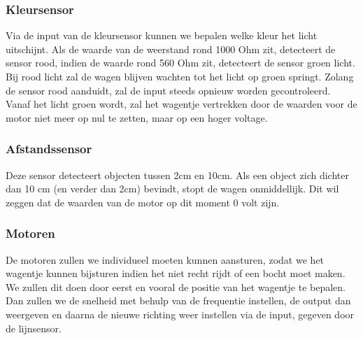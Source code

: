\documentclass[kulak]{kulakarticle} %
\begin{document}
\subsubsection{Kleursensor}
Via de input van de kleursensor kunnen we bepalen welke kleur het licht uitschijnt. Als de waarde van de weerstand rond 1000 Ohm zit, detecteert de sensor rood, indien de waarde rond 560 Ohm zit, detecteert de sensor groen licht. Bij rood licht zal de wagen blijven wachten tot het licht op groen springt. Zolang de sensor rood aanduidt, zal de input steeds opnieuw worden gecontroleerd. Vanaf het licht groen wordt, zal het wagentje vertrekken door de waarden voor de motor niet meer op nul te zetten, maar op een hoger voltage.
\subsubsection{Afstandssensor}
Deze sensor detecteert objecten tussen 2cm en 10cm. Als een object zich dichter dan 10 cm (en verder dan 2cm) bevindt, stopt de wagen onmiddellijk. Dit wil zeggen dat de waarden van de motor op dit moment 0 volt zijn.
\subsubsection{Motoren}
De motoren zullen we individueel moeten kunnen aansturen, zodat we het wagentje  kunnen bijsturen indien het niet recht rijdt of een bocht moet maken. We zullen dit doen door eerst en vooral de positie van het wagentje te bepalen. Dan zullen we de snelheid met behulp van de frequentie instellen, de output dan weergeven en daarna de nieuwe richting weer instellen via de input, gegeven door de lijnsensor. 
\end{document}
